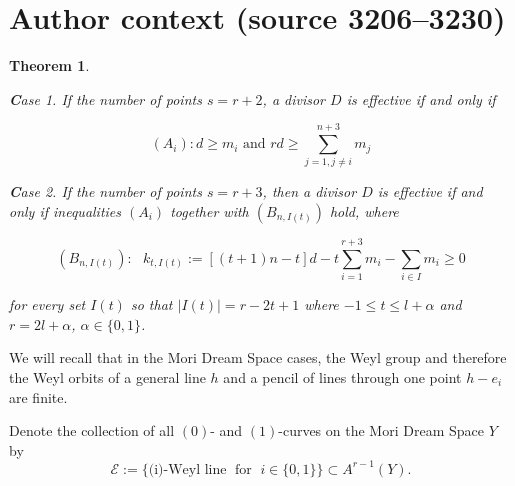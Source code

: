 \documentclass[10pt,a4paper]{amsart}
\newtheorem{theorem}{Theorem}
\def\calO{\mathcal{O}}
\begin{document}



\section*{Author context (source 3206--3230)}
\begin{theorem}\cite[Theorem 5.1]{bdp3}

{\textbf Case 1}. If the number of points $s=r+2$,
a divisor $D$ is effective if and only if

$$(A_{i}): d\geq m_i \text{ and } rd \geq \sum_{j=1, j\neq i}^{n+3} m_j$$

{\textbf Case 2}.  If the number of points $s=r+3$,
then a divisor $D$ is effective if and only if
inequalities $(A_{i})$ together with $(B_{n, I(t)})$ hold, where

$$(B_{n, I(t)}): \text{  }  k_{t, I(t)}:=[(t+1)n - t] d - t \sum_{i=1}^{r+3} m_i - \sum_{i\in I} m_i\geq 0$$
 
for every  set $I(t)$ so that $|I(t)|=r-2t+1$ where $-1\leq t \leq l+\alpha$ and $r=2l+\alpha$, $\alpha\in \{0, 1\}$.
\end{theorem}


We will recall  that in the Mori Dream Space cases,
the Weyl group and therefore the Weyl orbits
of a general line $h$ and a pencil of lines through one point $h-e_i$ are finite.

Denote the collection of all $(0)$- and $(1)$-curves on the Mori Dream Space $Y$ by
\begin{equation}\label{equation1}
\mathcal{E}:=\{\text{(i)-Weyl line}  \;\text{ for }\; i \in \{0,1\}\} \subset A^{r-1}(Y).
\end{equation}
\end{document}
